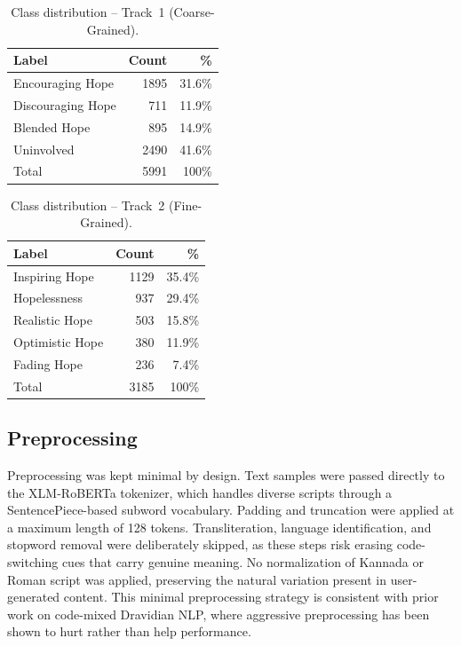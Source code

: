 \documentclass[11pt]{article}
\begin{document}
\begin{table}[h]
\centering
\begin{tabular}{lrr}
\toprule
\textbf{Label} & \textbf{Count} & \textbf{\%} \\
\midrule
Encouraging Hope & 1895 & 31.6\% \\
Discouraging Hope & 711 & 11.9\% \\
Blended Hope & 895 & 14.9\% \\
Uninvolved & 2490 & 41.6\% \\
\midrule
Total & 5991 & 100\% \\
\bottomrule
\end{tabular}
\caption{Class distribution -- Track~1 (Coarse-Grained).}
\label{tab:track1}
\end{table}

\begin{table}[h]
\centering
\begin{tabular}{lrr}
\toprule
\textbf{Label} & \textbf{Count} & \textbf{\%} \\
\midrule
Inspiring Hope & 1129 & 35.4\% \\
Hopelessness & 937 & 29.4\% \\
Realistic Hope & 503 & 15.8\% \\
Optimistic Hope & 380 & 11.9\% \\
Fading Hope & 236 & 7.4\% \\
\midrule
Total & 3185 & 100\% \\
\bottomrule
\end{tabular}
\caption{Class distribution -- Track~2 (Fine-Grained).}
\label{tab:track2}
\end{table}

\subsection{Preprocessing}

Preprocessing was kept minimal by design. Text
samples were passed directly to the XLM-RoBERTa tokenizer, which handles diverse scripts
through a SentencePiece-based subword vocabulary. Padding and truncation were applied at a maximum length of 128 tokens. Transliteration, language identification, and stopword removal were
deliberately skipped, as these steps risk erasing
code-switching cues that carry genuine meaning.
No normalization of Kannada or Roman script was
applied, preserving the natural variation present
in user-generated content. This minimal preprocessing strategy is consistent with prior work on
code-mixed Dravidian NLP, where aggressive preprocessing has been shown to hurt rather than help
performance.
\end{document}
